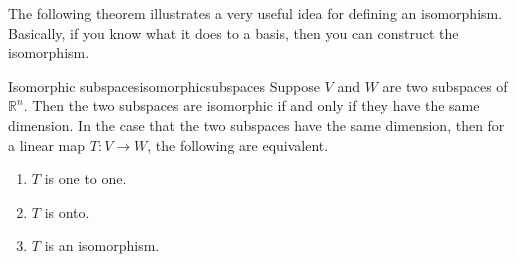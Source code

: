 The following theorem illustrates a very useful idea for defining an
isomorphism. Basically, if you know what it does to a basis, then you can
construct the isomorphism.

\begin{theorem}{Isomorphic subspaces}{isomorphicsubspaces}
Suppose $V$ and $W$ are two subspaces of $\mathbb{R}^n$. Then the two
subspaces are isomorphic if and only if they have the same dimension. In the
case that the two subspaces have the same dimension, then for
 a linear map $T:V\rightarrow W$, the
following are equivalent.

\begin{enumerate}
\item $T$ is one to one.

\item $T$ is onto.

\item $T$ is an isomorphism.
\end{enumerate}
\end{theorem}

